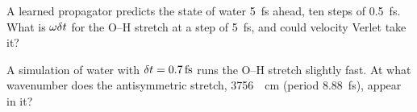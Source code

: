 \begin{exercise}
\label{ex:in-long-step}
A learned propagator predicts the state of water \SI{5}{\femto\second}
ahead, ten steps of \SI{0.5}{\femto\second}. What is $\omega\delta t$ for the
O--H stretch at a step of \SI{5}{\femto\second}, and could velocity
Verlet take it?
\end{exercise}

\begin{exercise}
\label{ex:in-spectrum}
A simulation of water with $\dt = \SI{0.7}{\femto\second}$ runs the O--H
stretch slightly fast. At what wavenumber does the antisymmetric stretch,
\SI{3756}{\per\centi\metre} (period \SI{8.88}{\femto\second}), appear in
it?
\end{exercise}
